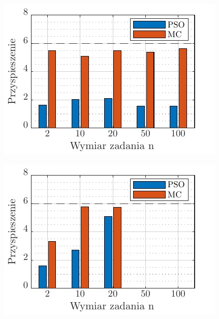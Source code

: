 \documentclass[11pt, a4paper, oneside]{article}
\begin{document}
\begin{figure}[H]
\centering
\begin{minipage}[b]{\dimexpr.5\textwidth-1em}
  \centering
  \includegraphics[width=1\linewidth]{grafiki/przyspieszenieMPI1.pdf}
  \label{fig:przysp:zad1}
\end{minipage} \hfill
\begin{minipage}[b]{\dimexpr.5\textwidth-1em}
  \centering
  \includegraphics[width=1\linewidth]{grafiki/przyspieszenieMPI2.pdf}
  \label{fig:przysp:zad2}
\end{minipage}
\end{figure}
\end{document}
